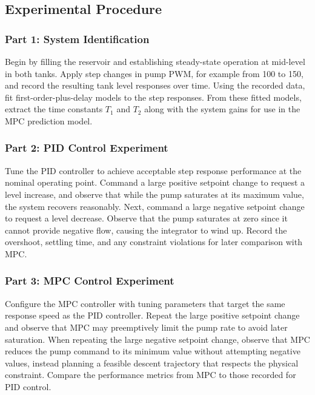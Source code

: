 \subsection{Experimental Procedure}

\subsubsection{Part 1: System Identification}

Begin by filling the reservoir and establishing steady-state operation at mid-level in both tanks. Apply step changes in pump PWM, for example from 100 to 150, and record the resulting tank level responses over time. Using the recorded data, fit first-order-plus-delay models to the step responses. From these fitted models, extract the time constants $T_1$ and $T_2$ along with the system gains for use in the MPC prediction model.

\subsubsection{Part 2: PID Control Experiment}

Tune the PID controller to achieve acceptable step response performance at the nominal operating point. Command a large positive setpoint change to request a level increase, and observe that while the pump saturates at its maximum value, the system recovers reasonably. Next, command a large negative setpoint change to request a level decrease. Observe that the pump saturates at zero since it cannot provide negative flow, causing the integrator to wind up. Record the overshoot, settling time, and any constraint violations for later comparison with MPC.

\subsubsection{Part 3: MPC Control Experiment}

Configure the MPC controller with tuning parameters that target the same response speed as the PID controller. Repeat the large positive setpoint change and observe that MPC may preemptively limit the pump rate to avoid later saturation. When repeating the large negative setpoint change, observe that MPC reduces the pump command to its minimum value without attempting negative values, instead planning a feasible descent trajectory that respects the physical constraint. Compare the performance metrics from MPC to those recorded for PID control.

